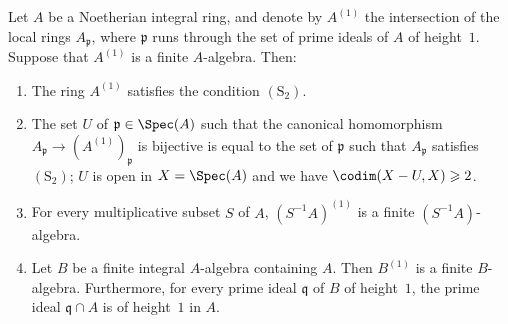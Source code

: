 \begin{proposition}[5.10.17]
\label{IV.5.10.17}
Let $A$ be a Noetherian integral ring, and denote by $A^{(1)}$ the intersection of the local rings $A_\mathfrak{p}$, where $\mathfrak{p}$ runs through the set of prime ideals of $A$ of height~$1$.
Suppose that $A^{(1)}$ is a finite $A$-algebra.
Then:
\begin{enumerate}[label=\emph{\roman*)}]
  \item The ring $A^{(1)}$ satisfies the condition $(\mathrm{S}_2)$.
  \item The set $U$ of $\mathfrak{p}\in\Spec(A)$ such that the canonical homomorphism $A_\mathfrak{p}\to(A^{(1)})_\mathfrak{p}$ is bijective is equal to the set of $\mathfrak{p}$ such that $A_\mathfrak{p}$ satisfies $(\mathrm{S}_2)$; $U$ is open in $X=\Spec(A)$ and we have $\codim(X-U,X)\geqslant 2$.
  \item For every multiplicative subset $S$ of $A$, $(S^{-1}A)^{(1)}$ is a finite $(S^{-1}A)$-algebra.
  \item Let $B$ be a finite integral $A$-algebra containing $A$.
Then $B^{(1)}$ is a finite $B$-algebra.
Furthermore, for every prime ideal $\mathfrak{q}$ of $B$ of height~$1$, the prime ideal $\mathfrak{q}\cap A$ is of height~$1$ in $A$.
\end{enumerate}
\end{proposition}


